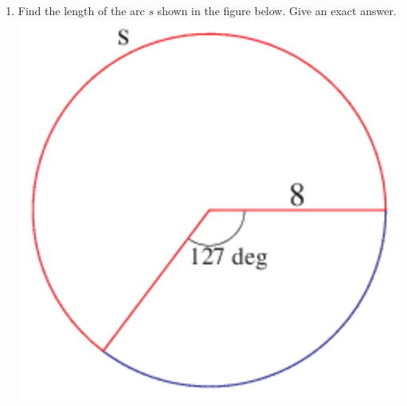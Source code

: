 \begin{enumerate}
\item Find the length of the arc $s$ shown in the figure below.  Give an exact answer.\vfil
\includegraphics[scale=.5]{redarc}



\end{enumerate}

